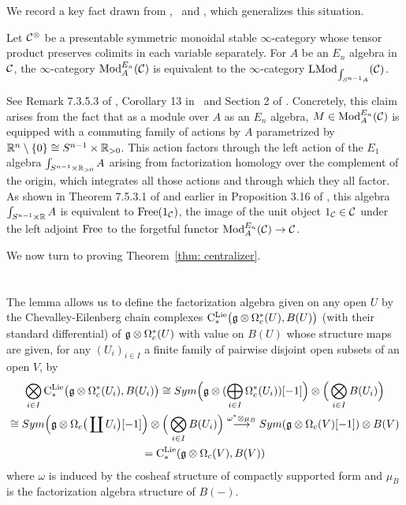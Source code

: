 \documentclass[11pt]{amsart}
\numberwithin{equation}{section}
\begin{document}
We record a key fact drawn from \cite{LurieHA},~\cite{FrancisHH}  and \cite{GG-Notes}, which generalizes this situation.

\begin{prp}
\label{P:ModentoModSn}
Let $\mathcal C^\otimes$ be a presentable symmetric monoidal stable $\infty$-category whose tensor product preserves colimits in each variable separately.
For $A$ be an $E_n$ algebra in $\mathcal C$,
the $\infty$-category ${\rm Mod}^{E_n}_A(\mathcal C)$ is equivalent to the $\infty$-category ${\rm LMod}_{\int_{S^{n-1} A}}(\mathcal C)$.
\end{prp}

See Remark 7.3.5.3 of \cite{LurieHA}, Corollary 13 in~\cite{GG-Notes} and Section 2 of \cite{FrancisHH}.
Concretely, this claim arises from the fact that as a module over $A$ as an $E_n$ algebra, 
$M \in {\rm Mod}^{E_n}_A(\mathcal C)$ is equipped with a commuting family of actions by $A$ parametrized by $\mathbb R^n \setminus \{0\}\cong S^{n-1} \times \mathbb R_{>0}$.
This action factors through the left action of the $E_1$ algebra $\int_{S^{n-1} \times \mathbb R_{>0}} A$ arising from factorization homology over the complement of the origin,
which integrates all those actions and through which they all factor. 
As shown in Theorem 7.5.3.1 of \cite{LurieHA} and earlier in Proposition 3.16 of \cite{FrancisHH}, 
this algebra $\int_{S^{n-1} \times \mathbb R} A$ is equivalent to ${\rm Free}(1_\mathcal C)$, 
the image of the unit object $1_\mathcal C \in \mathcal C$ under the left adjoint ${\rm Free}$ to the forgetful functor ${\rm Mod}^{E_n}_A(\mathcal C) \to \mathcal C$.

We now turn to proving Theorem~\ref{thm: centralizer}.

\section{}

The lemma allows us to define the factorization algebra given on any open $U$ by  the Chevalley-Eilenberg chain complexes
$ {\rm C}^{\rm Lie}_*\big(\mathfrak g \otimes \Omega^*_c(U), B(U) \big)$ (with their standard differential)
of $\mathfrak g \otimes \Omega^*_c(U)$ with value on $B(U)$ whose structure maps are given, for any $(U_i)_{i\in I}$ 
a finite family of pairwise disjoint open subsets of an open $V$, by 
\begin{multline}\label{eq:transClieFac}
 \bigotimes_{i\in I} {\rm C}^{\rm Lie}_*\big(\mathfrak g \otimes \Omega^*_c(U_i), B(U_i) \big) \cong Sym\Big(
 \mathfrak g\otimes (\bigoplus_{i\in I}  \Omega^*_c(U_i))[-1]  \Big) \otimes \Big( \bigotimes_{i\in I} B(U_i)\Big) \\ 
 \cong Sym\Big(\mathfrak g\otimes \Omega_c\big(\coprod U_i\big)[-1] \Big) \otimes \Big( \bigotimes_{i\in I} B(U_i)\Big)  
 \stackrel{\omega^*\otimes \mu_B}\longrightarrow Sym(\mathfrak g\otimes \Omega_c(V)[-1] ) \otimes B(V) \\ 
 = {\rm C}^{\rm Lie}_*(\mathfrak g\otimes \Omega_c(V), B(V))
\end{multline}
where $\omega$ is induced by the cosheaf structure of compactly supported form and $\mu_B$ is the factorization algebra structure of $B(-)$.
\end{document}
